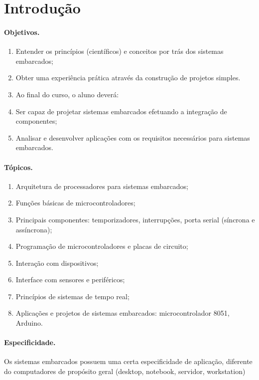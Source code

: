 \section*{Introdução}

\paragraph{Objetivos.}

\begin{enumerate}
\item Entender os princípios (científicos) e conceitos por trás dos sistemas embarcados;
\item Obter uma experiência prática através da construção de projetos simples.
\item Ao final do curso, o aluno deverá:
\item Ser capaz de projetar sistemas embarcados efetuando a integração de componentes;
\item Analisar e desenvolver aplicações com os requisitos necessários para sistemas embarcados.
\end{enumerate}

\paragraph{Tópicos.}

\begin{enumerate}
\item Arquitetura de processadores para sistemas embarcados;
\item Funções básicas de microcontroladores;
\item Principais componentes: temporizadores, interrupções, porta serial (síncrona e assíncrona);
\item Programação de microcontroladores e placas de circuito;
\item Interação com dispositivos;
\item Interface com sensores e periféricos;
\item Princípios de sistemas de tempo real;
\item Aplicações e projetos de sistemas embarcados: microcontrolador 8051, Arduino. 
\end{enumerate}

\paragraph{Especificidade.}

Os sistemas embarcados possuem uma certa especificidade de aplicação,
diferente do computadores de propósito geral (desktop, notebook, 
servidor, workstation)

